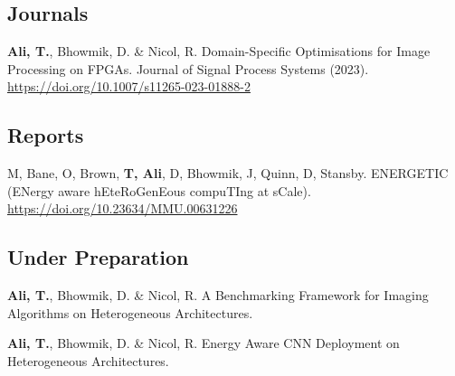 \subsection*{Journals}
\textbf{Ali, T.}, Bhowmik, D. \& Nicol, R. Domain-Specific Optimisations for Image Processing on FPGAs. Journal of Signal Process Systems (2023). \newline
\url{https://doi.org/10.1007/s11265-023-01888-2}

\subsection*{Reports}
M, Bane, O, Brown, \textbf{T, Ali}, D, Bhowmik, J, Quinn, D, Stansby. ENERGETIC (ENergy aware hEteRoGenEous compuTIng at sCale). \newline
\url{https://doi.org/10.23634/MMU.00631226}

\subsection*{Under Preparation}
\textbf{Ali, T.}, Bhowmik, D. \& Nicol, R. A Benchmarking Framework for Imaging Algorithms on Heterogeneous Architectures. 

\begin{flushleft}
\textbf{Ali, T.}, Bhowmik, D. \& Nicol, R. Energy Aware CNN Deployment on Heterogeneous Architectures.
\end{flushleft}
